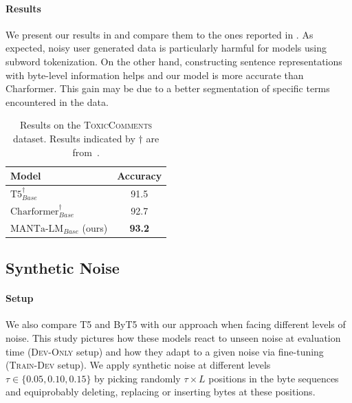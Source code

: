 \paragraph{Results} We present our results in  and compare them to the ones reported in \citet{tay2021charformer}. As expected, noisy user generated data is particularly harmful for models using subword tokenization. On the other hand, constructing sentence representations with byte-level information  helps and our model is more accurate than Charformer. This gain may be due to a better segmentation of specific terms encountered in the data.


\begin{table}[t]
    \centering\small
    \begin{tabular}{lc}
    \toprule
    Model                                   & Accuracy      \\ \midrule
    $\text{T5}_{Base}^\dagger$              & 91.5          \\
    $\text{Charformer}_{Base}^\dagger$      & 92.7          \\
    $\text{MANTa-LM}_{Base}$ (ours)      & {\textbf{93.2}}   \\\bottomrule
    \end{tabular}
    \caption{Results on the \textsc{ToxicComments} dataset. Results indicated by $\dagger$ are from~\citet{tay2021charformer}.}
    \label{tab:toxic}
    \end{table}


\subsection{Synthetic Noise}
\paragraph{Setup} We also compare T5 and ByT5 with our approach when facing different levels of noise. This study pictures how these models react to unseen noise at evaluation time (\textsc{Dev-Only} setup) and how they adapt to a given noise via fine-tuning (\textsc{Train-Dev} setup). We apply synthetic noise at different levels $\tau\in\{0.05, 0.10, 0.15\}$ by picking randomly $\tau \times L$ positions in the byte sequences and equiprobably deleting, replacing or inserting bytes at these positions.



